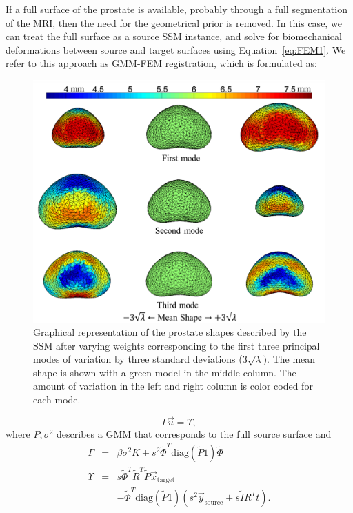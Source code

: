 \documentclass[journal]{IEEEtran}
\newcommand{\trans}[1]{#1^{\scriptscriptstyle T}}
\newcommand{\diag}{\mathrm{diag}}
\begin{document}
If a full surface of the prostate is available, probably through a full segmentation of the MRI, then the need for the geometrical prior is removed. In this case, we can treat the full surface as a source SSM instance, and solve for biomechanical deformations between source and target surfaces using Equation~\ref{eq:FEM1}. We refer to this approach as GMM-FEM registration, which is formulated as:
\begin{figure}[t]
	\centering
	\includegraphics[width=\columnwidth]{images/SSM_modes_inferior}
	\caption{Graphical representation of the prostate shapes described by the SSM after varying weights corresponding to the first three principal modes of variation by three standard deviations ($3\sqrt{\lambda})$. The mean shape is shown with a green model in the middle column. The amount of variation in the left and right column is color coded for each mode.}\label{fig:SSM_modes}
\end{figure}
\begin{equation} \label{eq:GMMFEM1}
\Gamma\vec{u} = \Upsilon,
\end{equation}
where $P,\sigma^2$ describes a GMM that corresponds to the full source surface and
\begin{eqnarray} \label{eq:GMMFEM2}
 \Gamma &=& \beta \sigma^2K + s^2\trans{\tilde{\Phi}}\diag\left(\tilde{P}1\right)\tilde{\Phi}\\
 \Upsilon &=& s\trans{\tilde{\Phi}}\trans{\tilde{R}}\tilde{P}\vec{x}_\mathrm{target}\nonumber\\
 && -\trans{\tilde{\Phi}}\diag\left(\tilde{P}1\right)\left(s^2\vec{y}_\mathrm{source}+s\tilde{I}\trans{R}t\right)\nonumber.
\end{eqnarray}
\end{document}
